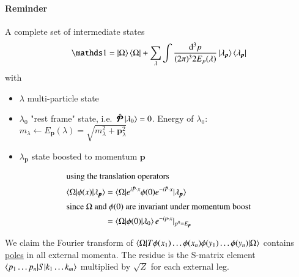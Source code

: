 \paragraph{Reminder}
A complete set of intermediate states
\begin{align}
   \id = \ket{\Omega}\bra{\Omega} + \sum_\lambda \int \frac{\dd^3 p}{(2\pi)^3 2 E_p(\lambda)} \ket{\lambda_{\pmb{p}}} \bra{\lambda_{\pmb{p}}}
\end{align}
with
\begin{itemize}
   \item $\lambda$ multi-particle state
   \item $\lambda_0$ "rest frame" state, i.e.~$\hat{\pmb{\mathcal{P}}} \ket{\lambda_0} = 0$. Energy of $\lambda_0$: $m_\lambda \leftarrow E_{\pmb{p}}(\lambda) = \sqrt{m^2_\lambda + \pmb{p}_{\lambda}^2 }$
   \item $\lambda_{\pmb{p}}$ state boosted to momentum $\pmb{p}$
\end{itemize}

\begin{align*}
   \shortintertext{using the translation operators}
   \braket{\Omega | \phi(x) | \lambda_{\pmb{p}}} &= \braket{\Omega | e^{i\hat{P}\cdot x} \phi(0) e^{-i\hat{P}\cdot x}| \lambda_{\pmb{p}}}  \\
   \shortintertext{since $\Omega$ and $\phi(0)$ are invariant under momentum boost}
                                                 &= \braket{\Omega | \phi(0) | \lambda_0} e^{-ip\cdot x} |_{p^0=E_{\pmb{p}}}
\end{align*}

We claim the Fourier transform of $\braket{\Omega | T \phi(x_1)\dots \phi(x_n)\phi(y_1)\dots\phi(y_n)|\Omega}$ contains \underline{poles} in all external momenta. The residue is the S-matrix element $\braket{p_1 \dots p_n | S | k_1 \dots k_m}$ multiplied by $\sqrt{Z}$ for each external leg.

